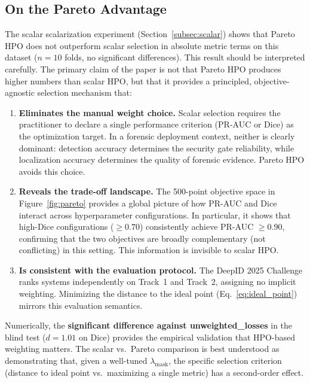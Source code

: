 \subsection{On the Pareto Advantage}

The scalar scalarization experiment (Section~\ref{subsec:scalar}) shows that
Pareto HPO does not outperform scalar selection in absolute metric terms on this
dataset ($n = 10$ folds, no significant differences). This result should be
interpreted carefully. The primary claim of the paper is not that Pareto HPO
produces higher numbers than scalar HPO, but that it provides a principled,
objective-agnostic selection mechanism that:

\begin{enumerate}
  \item \textbf{Eliminates the manual weight choice.} Scalar selection requires
  the practitioner to declare a single performance criterion (PR-AUC or Dice)
  as the optimization target. In a forensic deployment context, neither is
  clearly dominant: detection accuracy determines the security gate reliability,
  while localization accuracy determines the quality of forensic evidence.
  Pareto HPO avoids this choice.

  \item \textbf{Reveals the trade-off landscape.} The 500-point objective space
  in Figure~\ref{fig:pareto} provides a global picture of how PR-AUC and Dice
  interact across hyperparameter configurations. In particular, it shows that
  high-Dice configurations ($\geq 0.70$) consistently achieve PR-AUC $\geq 0.90$,
  confirming that the two objectives are broadly complementary (not conflicting)
  in this setting. This information is invisible to scalar HPO.

  \item \textbf{Is consistent with the evaluation protocol.} The DeepID 2025
  Challenge ranks systems independently on Track~1 and Track~2, assigning no
  implicit weighting. Minimizing the distance to the ideal point (Eq.~\ref{eq:ideal_point})
  mirrors this evaluation semantics.
\end{enumerate}

Numerically, the \textbf{significant difference against unweighted\_losses} in the
blind test ($d = 1.01$ on Dice) provides the empirical validation that HPO-based
weighting matters. The scalar vs.\ Pareto comparison is best understood as
demonstrating that, given a well-tuned $\lambda_{\text{mask}}$, the specific
selection criterion (distance to ideal point vs.\ maximizing a single metric)
has a second-order effect.


